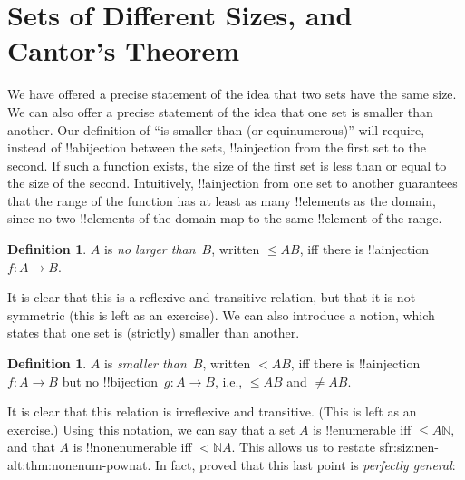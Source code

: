 \documentclass[10pt,a4paper]{article}
\makeatletter
\theoremstyle{plain}
\theoremstyle{definition}
\newtheorem{defn}[thm]{Definition}
\theoremstyle{remark}
\newenvironment{explain}{}{}
\newcommand*{\olfileid}[3]{}
\newcommand*{\olsection}[1]{\section*{#1}}
\newcommand{\olref}{\@ifnextchar[{\olref@i}{\olref@final}}
\def\olref@i[#1]{\@ifnextchar[{\olref@ii}{\olref@final}}
\def\olref@ii[#1]{\@ifnextchar[{\olref@iii}{\olref@final}}
\def\olref@iii[#1]{\olref@final}
\def\olref@final#1{\ref{#1}}
\providecommand{\Nat}{\ensuremath{\mathbb{N}}}
\providecommand{\cardle}{\leq}
\providecommand{\PosInt}{\mathbb{Z}^{+}}
\providecommand{\Pow}{\mathcal{P}}
\providecommand{\oliflabeldef}[3]{#1}
\providecommand{\citet}[1]{\cite{#1}}
\providecommand{\cardneq}{\neq}
\providecommand{\cardless}{<}
\providecommand{\cardless}{<}
\providecommand{\cardneq}{\neq}
\providecommand{\cardle}{\leq}
\providecommand{\oliflabeldef}[2]{#1}
\makeatother
\begin{document}



\olfileid{sfr}{siz}{car}

\olsection{Sets of Different Sizes, and Cantor's Theorem}

\begin{explain}
We have offered a precise statement of the idea that two sets have the
same size. We can also offer a precise statement of the idea that one
set is smaller than another. Our definition of ``is smaller than (or
equinumerous)'' will require, instead of !!a{bijection} between the
sets, !!a{injection} from the first set to the second. If such a
function exists, the size of the first set is less than or equal to
the size of the second. Intuitively, !!a{injection} from one set to
another guarantees that the range of the function has at least as many
!!{element}s as the domain, since no two !!{element}s of the domain
map to the same !!{element} of the range.
\end{explain}

\begin{defn}
$A$ is \emph{no larger than}~$B$, written $\cardle{A}{B}$, iff there
is !!a{injection} $f \colon A \to B$.
\end{defn}

It is clear that this is a reflexive and transitive relation, but that
it is not symmetric (this is left as an exercise). We can also
introduce a notion, which states that one set is (strictly) smaller
than another. 

\begin{defn}
$A$ is \emph{smaller than}~$B$, written $\cardless{A}{B}$, iff there
is !!a{injection}~$f\colon A \to B$ but no !!{bijection}~$g\colon A
\to B$, i.e., $\cardle{A}{B}$ and $\cardneq{A}{B}$.
\end{defn}

It is clear that this relation is irreflexive
and transitive. (This is left as an exercise.) Using this notation, we
can say that a set $A$ is !!{enumerable} iff $\cardle{A}{\Nat}$, and
that $A$ is !!{nonenumerable} iff $\cardless{\Nat}{A}$. This allows us
to restate
\oliflabeldef{sfr:siz:nen-alt:thm:nonenum-pownat}{%
\olref[sfr][siz][nen-alt]{thm:nonenum-pownat}
as the observation that
$\cardless{\Nat}{\Pow{\Nat}}$}{%
\olref[sfr][siz][nen]{thm:nonenum-pownat}
as the observation that $\cardless{\PosInt}{\Pow{\PosInt}}$}. In fact,
\citet{Cantor1892} proved that this last point is \emph{perfectly
general}:
\end{document}
